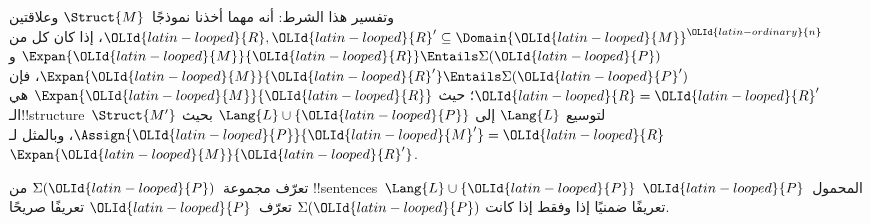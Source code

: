 \documentclass[../../../include/open-logic-section]{subfiles}
\begin{document}
وتفسير هذا الشرط: أنه مهما أخذنا نموذجًا~$\Struct{M}$ وعلاقتين
${\OLId{latin-looped}{R}},{\OLId{latin-looped}{R}}' \subseteq \Domain{{\OLId{latin-looped}{M}}}^{\OLId{latin-ordinary}{n}}$، إذا كان كل من
$\Expan{{\OLId{latin-looped}{M}}}{{\OLId{latin-looped}{R}}} \Entails \Sigma({\OLId{latin-looped}{P}})$ و
$\Expan{{\OLId{latin-looped}{M}}}{{\OLId{latin-looped}{R}}'} \Entails \Sigma({\OLId{latin-looped}{P}}')$، فإن ${\OLId{latin-looped}{R}}={\OLId{latin-looped}{R}}'$؛ حيث
$\Expan{{\OLId{latin-looped}{M}}}{{\OLId{latin-looped}{R}}}$ هي الـ!!{structure}~$\Struct{M'}$ لتوسيع $\Lang{L}$
إلى $\Lang{L} \cup \{{\OLId{latin-looped}{P}}\}$ بحيث $\Assign{{\OLId{latin-looped}{P}}}{{\OLId{latin-looped}{M}}'}={\OLId{latin-looped}{R}}$، وبالمثل لـ
$\Expan{{\OLId{latin-looped}{M}}}{{\OLId{latin-looped}{R}}'}$.

\begin{thm}
تعرّف مجموعة~$\Sigma({\OLId{latin-looped}{P}})$ من !!{sentence}s~$\Lang{L} \cup \{{\OLId{latin-looped}{P}}\}$
المحمول~${\OLId{latin-looped}{P}}$ تعريفًا ضمنيًا إذا وفقط إذا كانت $\Sigma({\OLId{latin-looped}{P}})$ تعرّف~${\OLId{latin-looped}{P}}$
تعريفًا صريحًا.
\end{thm}
\end{document}
